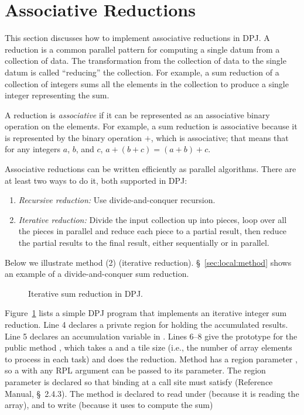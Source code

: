 \section{Associative Reductions%
\label{sec:reductions}}

This section discusses how to implement associative reductions in DPJ.
A reduction is a common parallel pattern for computing a single datum
from a collection of data.  The transformation from the collection of
data to the single datum is called ``reducing'' the collection.  For
example, a sum reduction of a collection of integers sums all the
elements in the collection to produce a single integer representing
the sum.

A reduction is \emph{associative} if it can be represented as an
associative binary operation on the elements.  For example, a sum
reduction is associative because it is represented by the binary
operation $+$, which is associative; that means that for any integers
$a$, $b$, and $c$, $a+(b+c)=(a+b)+c$.  

 Associative reductions can be
written efficiently as parallel algorithms.  There are at least two
ways to do it, both supported in DPJ:
%
\begin{enumerate}
%
\item \emph{Recursive reduction:} Use divide-and-conquer recursion.
%
\item \emph{Iterative reduction:} Divide the input collection up into
  pieces, loop over all the pieces in parallel and reduce each piece
  to a partial result, then reduce the partial results to the final
  result, either sequentially or in parallel.
%
\end{enumerate}
%
Below we illustrate method (2) (iterative reduction).
\S~\ref{sec:local:method} shows an example of a divide-and-conquer sum
reduction.

\begin{figure}

\caption{Iterative sum reduction in DPJ.}
\label{fig:reductions:pattern}
\end{figure}

Figure~\ref{fig:reductions:pattern} lists a simple DPJ program that
implements an iterative integer sum reduction.  Line 4 declares a
private region  for holding the accumulated results.
Line 5 declares an accumulation variable  in .
Lines 6--8 give the prototype for the public method ,
which takes a  and a tile size (i.e., the number of
array elements to process in each task) and does the reduction.
Method  has a region parameter , so a
 with any RPL argument can be passed to its 
parameter.  The region parameter is declared so that binding
 at a call site must satisfy 
(Reference Manual, \S~2.4.3).  The method is declared to read under
 (because it is reading the array), and to write 
(because it uses  to compute the sum)

